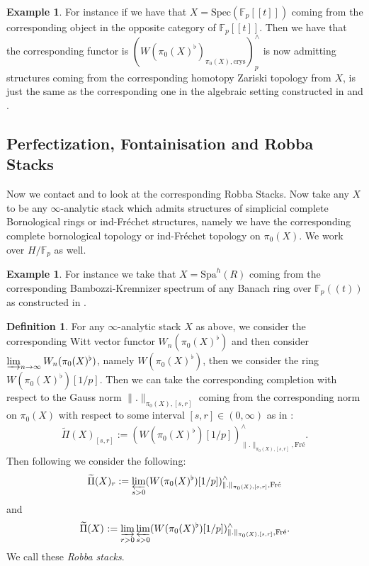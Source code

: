 \documentclass[12pt]{amsart}
\theoremstyle{definition}
\newtheorem{definition}[theorem]{Definition}
\numberwithin{equation}{section}
\newtheorem{example}[theorem]{Example}
\begin{document}
\begin{example}
For instance if we have that $X=\mathrm{Spec}(\mathbb{F}_p[[t]])$ coming from the corresponding object in the opposite category of $\mathbb{F}_p[[t]]$. Then we have that the corresponding functor is $(W(\pi_0(X)^\flat)_{\pi_0(X),\mathrm{crys}})_{p}^\wedge$ is now admitting structures coming from the corresponding homotopy Zariski topology from $X$, is just the same as the corresponding one in the algebraic setting constructed in \cite[Proposition 5.3]{R} and \cite[Section 1.1]{Dr1}.	
\end{example}





\subsection{Perfectization, Fontainisation and Robba Stacks}


\indent Now we contact \cite{KL1} and \cite{KL2} to look at the corresponding Robba Stacks. Now take any $X$ to be any $\infty$-analytic stack which admits structures of simplicial complete Bornological rings or ind-Fr\'echet structures, namely we have the corresponding complete bornological topology or ind-Fr\'echet topology on $\pi_0(X)$. We work over $H/\mathbb{F}_p$ as well. 

\begin{example}
For instance we take that $X=\mathrm{Spa}^h(R)$ coming from the corresponding Bambozzi-Kremnizer spectrum of any Banach ring over $\mathbb{F}_p((t))$ as constructed in \cite{BK}. 
\end{example}


\begin{definition}
For any $\infty$-analytic stack $X$ as above, we consider the corresponding Witt vector functor $W_n(\pi_0(X)^\flat)$ and then consider $\varinjlim_{n\rightarrow \infty}W_n(\pi_0(X)^\flat)$, namely $W(\pi_0(X)^\flat)$, then we consider the ring $W(\pi_0(X)^\flat)[1/p]$. Then we can take the corresponding completion with respect to the Gauss norm $\|.\|_{\pi_0(X),[s,r]}$ coming from the corresponding norm on $\pi_0(X)$ with respect to some interval $[s,r]\in (0,\infty)$ as in \cite[Definition 4.1.1]{KL2}:
\begin{align}
\widetilde{\Pi}(X)_{[s,r]}:=(W(\pi_0(X)^\flat)[1/p])^\wedge_{\|.\|_{\pi_0(X),[s,r]},\text{Fr\'e}}.	
\end{align}
Then following \cite[Definition 4.1.1]{KL2} we consider the following:
\begin{align}
\widetilde{\Pi}(X)_{r}:=\varprojlim_{s>0}(W(\pi_0(X)^\flat)[1/p])^\wedge_{\|.\|_{\pi_0(X),[s,r]},\text{Fr\'e}}	
\end{align}
and 
\begin{align}
\widetilde{\Pi}(X)_{}:=\varinjlim_{r>0}\varprojlim_{s>0}(W(\pi_0(X)^\flat)[1/p])^\wedge_{\|.\|_{\pi_0(X),[s,r]},\text{Fr\'e}}.	
\end{align}
We call these \textit{Robba stacks}.
\end{definition}
 
\end{document}
